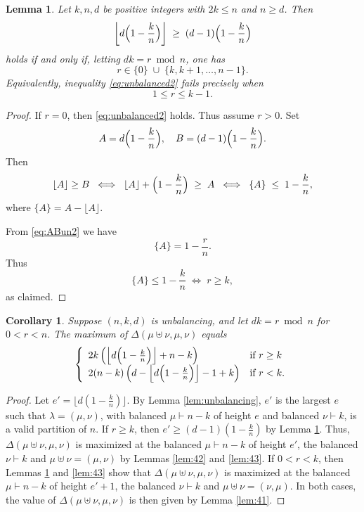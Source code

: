 \documentclass[12pt,dvipsnames,accepted=2016-08-18,a4paper,onecolumn]{quantumarticle}
\numberwithin{equation}{section}
\newtheorem{corollary}[theorem]{Corollary}
\newtheorem{lemma}[theorem]{Lemma}
\theoremstyle{definition}
\begin{document}
\begin{lemma}\label{lem:unbalanced2}
Let $k,n,d$ be positive integers with $2k\le n$ and $n\ge d$.  Then
\begin{equation}\label{eq:unbalanced2}
\left\lfloor d\Bigl(1-\frac{k}{n}\Bigr)\right\rfloor
\;\ge\;
(d-1)\Bigl(1-\frac{k}{n}\Bigr)
\end{equation}
holds if and only if, letting $dk = r\bmod n$,
one has
\[
r\in\{0\}\;\cup\;\{k,k+1,\dots,n-1\}.
\]
Equivalently, inequality \eqref{eq:unbalanced2} fails precisely when
\[
1 \le r \le k-1.
\]
\end{lemma}

\begin{proof}
If $r=0$, then \eqref{eq:unbalanced2} holds. Thus assume $r>0$.
Set
\begin{equation}\label{eq:ABun2}
A = d\Bigl(1-\frac{k}{n}\Bigr),
\quad
B = (d-1)\Bigl(1-\frac{k}{n}\Bigr).
\end{equation}
Then
\[
\lfloor A\rfloor \ge B
\;\iff\;
\lfloor A\rfloor +\Bigl(1-\frac{k}{n}\Bigr)\;\ge\;A
\;\iff\;
\{A\}\;\le\;1-\frac{k}{n},
\]
where $\{A\}=A-\lfloor A\rfloor$.  

From \eqref{eq:ABun2} we have
\[
\{A\}
=1-\frac rn.
\]
Thus
\[
\{A\}\le 1-\frac{k}{n}
\;\iff\;
r\geq k,
\]
as claimed.
\end{proof}


\begin{corollary}\label{cor:unbalancing}
Suppose $(n,k,d)$ is unbalancing, and let $dk = r\bmod n$ for $0< r<n$.
The maximum of $\Delta(\mu\uplus\nu,\mu,\nu)$ equals
$$\left\{
\begin{array}{ll}
2k\left(\left\lfloor d\Bigl(1-\frac{k}{n}\Bigr)\right\rfloor+ n-k\right) & \text{if }r\ge k\\
2 (n-k)\left(d - \left\lfloor d\Bigl(1-\frac{k}{n}\Bigr)\right\rfloor-1 + k\right) & \text{if }r<k.
\end{array}
\right.$$
\end{corollary}

\begin{proof}
Let $e'=\lfloor d(1-\frac{k}{n})\rfloor$. By Lemma \ref{lem:unbalancing}, $e'$ is the largest $e$ such that $\lambda=(\mu,\nu)$, with balanced $\mu\vdash n-k$ of height $e$ and balanced $\nu\vdash k$, is a valid partition of $n$.
If $r\ge k$, then $e'\ge (d-1)(1-\frac{k}{n})$ by Lemma \ref{lem:unbalanced2}. Thus, $\Delta(\mu\uplus\nu,\mu,\nu)$ is maximized at the balanced $\mu\vdash n-k$ of height $e'$, the balanced $\nu\vdash k$ and $\mu\uplus\nu=(\mu,\nu)$ by Lemmas \ref{lem:42} and \ref{lem:43}.
If $0<r<k$, then Lemmas \ref{lem:unbalanced2} and \ref{lem:43} show that $\Delta(\mu\uplus\nu,\mu,\nu)$ is maximized at the balanced $\mu\vdash n-k$ of height $e'+1$, the balanced $\nu\vdash k$ and $\mu\uplus\nu=(\nu,\mu)$.
In both cases, 
the value of $\Delta(\mu\uplus\nu,\mu,\nu)$
is then given by Lemma \ref{lem:41}.
\end{proof}
\end{document}
